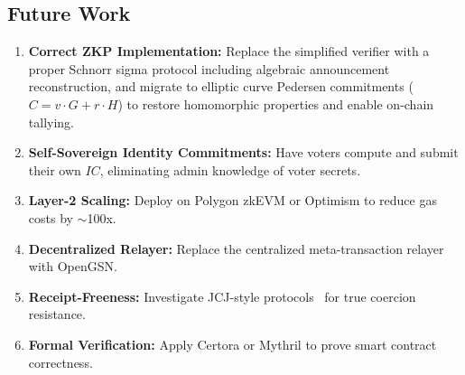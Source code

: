 \documentclass[conference]{IEEEtran}
\begin{document}
\subsection{Future Work}
\begin{enumerate}[leftmargin=*]
    \item \textbf{Correct ZKP Implementation:} Replace the simplified verifier with a proper Schnorr sigma protocol including algebraic announcement reconstruction, and migrate to elliptic curve Pedersen commitments ($C = v \cdot G + r \cdot H$) to restore homomorphic properties and enable on-chain tallying.
    \item \textbf{Self-Sovereign Identity Commitments:} Have voters compute and submit their own $IC$, eliminating admin knowledge of voter secrets.
    \item \textbf{Layer-2 Scaling:} Deploy on Polygon zkEVM or Optimism to reduce gas costs by $\sim$100x.
    \item \textbf{Decentralized Relayer:} Replace the centralized meta-transaction relayer with OpenGSN.
    \item \textbf{Receipt-Freeness:} Investigate JCJ-style protocols~\cite{juels2005} for true coercion resistance.
    \item \textbf{Formal Verification:} Apply Certora or Mythril to prove smart contract correctness.
\end{enumerate}
\end{document}
